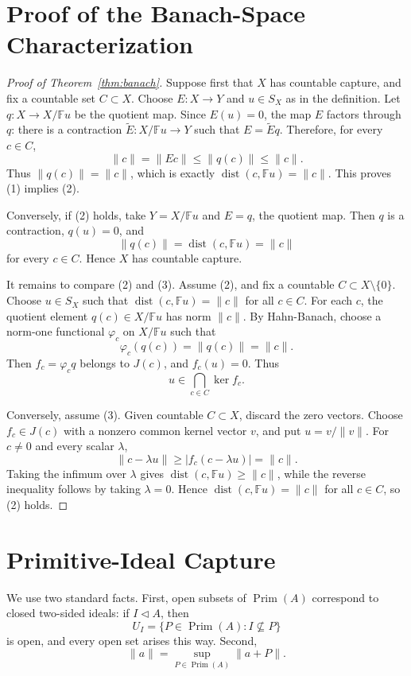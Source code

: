 \documentclass[11pt]{article}
\newcommand{\F}{\mathbb F}
\newcommand{\Prim}{\operatorname{Prim}}
\newcommand{\dist}{\operatorname{dist}}
\begin{document}
\section*{Proof of the Banach-Space Characterization}

\begin{proof}[Proof of Theorem~\ref{thm:banach}]
Suppose first that \(X\) has countable capture, and fix a countable set
\(C\subset X\).  Choose \(E:X\to Y\) and \(u\in S_X\) as in the definition.
Let \(q:X\to X/\F u\) be the quotient map.  Since \(E(u)=0\), the map \(E\)
factors through \(q\): there is a contraction \(\widetilde E:X/\F u\to Y\)
such that \(E=\widetilde E q\).  Therefore, for every \(c\in C\),
\[
        \|c\|=\|Ec\|\le \|q(c)\|\le \|c\|.
\]
Thus \(\|q(c)\|=\|c\|\), which is exactly
\(\dist(c,\F u)=\|c\|\).  This proves (1) implies (2).

Conversely, if (2) holds, take \(Y=X/\F u\) and \(E=q\), the quotient map.
Then \(q\) is a contraction, \(q(u)=0\), and
\[
        \|q(c)\|=\dist(c,\F u)=\|c\|
\]
for every \(c\in C\).  Hence \(X\) has countable capture.

It remains to compare (2) and (3).  Assume (2), and fix a countable
\(C\subset X\setminus\{0\}\).  Choose \(u\in S_X\) such that
\(\dist(c,\F u)=\|c\|\) for all \(c\in C\).  For each \(c\), the quotient
element \(q(c)\in X/\F u\) has norm \(\|c\|\).  By Hahn-Banach, choose a
norm-one functional \(\varphi_c\) on \(X/\F u\) such that
\[
        \varphi_c(q(c))=\|q(c)\|=\|c\|.
\]
Then \(f_c=\varphi_c q\) belongs to \(J(c)\), and \(f_c(u)=0\).  Thus
\[
        u\in \bigcap_{c\in C}\ker f_c.
\]

Conversely, assume (3).  Given countable \(C\subset X\), discard the zero
vectors.  Choose \(f_c\in J(c)\) with a nonzero common kernel vector \(v\),
and put \(u=v/\|v\|\).  For \(c\ne0\) and every scalar \(\lambda\),
\[
        \|c-\lambda u\|
        \ge
        |f_c(c-\lambda u)|
        =
        \|c\|.
\]
Taking the infimum over \(\lambda\) gives
\(\dist(c,\F u)\ge\|c\|\), while the reverse inequality follows by taking
\(\lambda=0\).  Hence \(\dist(c,\F u)=\|c\|\) for all \(c\in C\), so (2)
holds.
\end{proof}

\section*{Primitive-Ideal Capture}

We use two standard facts.  First, open subsets of \(\Prim(A)\) correspond to
closed two-sided ideals: if \(I\triangleleft A\), then
\[
        U_I=\{P\in\Prim(A): I\not\subseteq P\}
\]
is open, and every open set arises this way.  Second,
\[
        \|a\|=\sup_{P\in\Prim(A)}\|a+P\|.
\]
\end{document}
